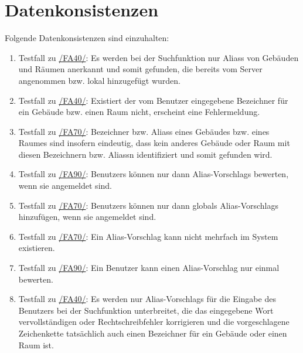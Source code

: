 \section{Datenkonsistenzen}

Folgende Datenkonsistenzen sind einzuhalten:
\begin{enumerate}[label=\textbf{/T\arabic*0/}, align=left, resume]
	\item \label{/T300/} Testfall zu \hyperref[/FA40/]{/FA40/}: Es werden bei der Suchfunktion nur \Glspl{Alias} von Gebäuden und Räumen anerkannt und somit gefunden, die bereits vom \Gls{Server} angenommen bzw. \gls{lokal} hinzugefügt wurden.
	\item \label{/T310/} Testfall zu \hyperref[/FA40/]{/FA40/}: Existiert der vom \Gls{Benutzer} eingegebene Bezeichner für ein Gebäude bzw. einen Raum nicht, erscheint eine Fehlermeldung.
	\item \label{/T320/} Testfall zu \hyperref[/FA70/]{/FA70/}: Bezeichner bzw. \Glspl{Alias} eines Gebäudes bzw. eines Raumes sind insofern eindeutig, dass kein anderes Gebäude oder Raum mit diesen Bezeichnern bzw. \Glspl{Alias}n identifiziert und somit gefunden wird.
	\item \label{/T330/} Testfall zu \hyperref[/FA90/]{/FA90/}: \Glspl{Benutzer} können nur dann \Glspl{Alias-Vorschlag} bewerten, wenn sie angemeldet sind.
	\item \label{/T340/} Testfall zu \hyperref[/FA70/]{/FA70/}: \Glspl{Benutzer} können nur dann \glspl{global} \Glspl{Alias-Vorschlag} hinzufügen, wenn sie angemeldet sind.
	\item \label{/T350/} Testfall zu \hyperref[/FA70/]{/FA70/}: Ein \Gls{Alias-Vorschlag} kann nicht mehrfach im System existieren.
	\item \label{/T360/} Testfall zu \hyperref[/FA90/]{/FA90/}: Ein \Gls{Benutzer} kann einen \Gls{Alias-Vorschlag} nur einmal bewerten.
	\item \label{/T370/} Testfall zu \hyperref[/FA40/]{/FA40/}: Es werden nur \Glspl{Alias-Vorschlag} für die Eingabe des \Gls{Benutzer}s bei der Suchfunktion unterbreitet, die das eingegebene Wort vervollständigen oder Rechtschreibfehler korrigieren und die vorgeschlagene Zeichenkette tatsächlich auch einen Bezeichner für ein Gebäude oder einen Raum ist.
\end{enumerate}